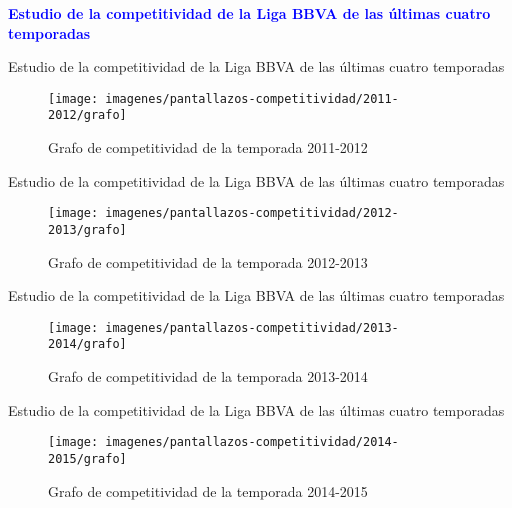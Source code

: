 \documentclass[10pt]{beamer}
\begin{document}
	\begin{frame}
		\begin{center}
			\Huge\textbf{\textsf{\textcolor{blue}{Estudio de la competitividad de la Liga BBVA de las últimas cuatro temporadas}}}
		\end{center}
	\end{frame}	
	
	\begin{frame}{Estudio de la competitividad de la Liga BBVA de las últimas cuatro temporadas}	
		\begin{figure}
			\centering
			\texttt{[image: imagenes/pantallazos-competitividad/2011-2012/grafo]}
			\caption{Grafo de competitividad de la temporada 2011-2012}
			\label{fig:2011-2012}
		\end{figure}
	\end{frame}
	
	\begin{frame}{Estudio de la competitividad de la Liga BBVA de las últimas cuatro temporadas}	
		\begin{figure}
			\centering
			\texttt{[image: imagenes/pantallazos-competitividad/2012-2013/grafo]}
			\caption{Grafo de competitividad de la temporada 2012-2013}
			\label{fig:2012-2013}
		\end{figure}
	\end{frame}
	
	\begin{frame}{Estudio de la competitividad de la Liga BBVA de las últimas cuatro temporadas}	
		\begin{figure}
			\centering
			\texttt{[image: imagenes/pantallazos-competitividad/2013-2014/grafo]}
			\caption{Grafo de competitividad de la temporada 2013-2014}
			\label{fig:2013-2014}
		\end{figure}
	\end{frame}
	
	\begin{frame}{Estudio de la competitividad de la Liga BBVA de las últimas cuatro temporadas}	
		\begin{figure}
			\centering
			\texttt{[image: imagenes/pantallazos-competitividad/2014-2015/grafo]}
			\caption{Grafo de competitividad de la temporada 2014-2015}
			\label{fig:2014-2015}
		\end{figure}
	\end{frame}
	
\end{document}
